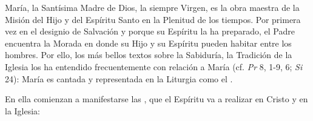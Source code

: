 	
	 María, la Santísima Madre de Dios, la siempre Virgen, es la obra maestra de la Misión del Hijo y del Espíritu Santo en la Plenitud de los tiempos. Por primera vez en el designio de Salvación y porque su Espíritu la ha preparado, el Padre encuentra la Morada en donde su Hijo y su Espíritu pueden habitar entre los hombres. Por ello, los más bellos textos sobre la Sabiduría, la Tradición de la Iglesia los ha entendido frecuentemente con relación a María (cf. \emph{Pr} 8, 1-9, 6; \emph{Si} 24): María es cantada y representada en la Liturgia como el .
	
	En ella comienzan a manifestarse las , que el Espíritu va a realizar en Cristo y en la Iglesia:
